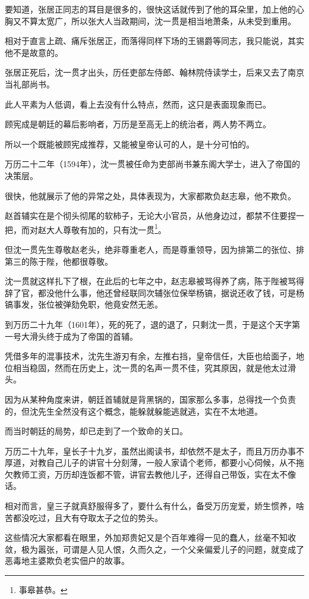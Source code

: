 \begin{multicols}{\theparacolNo}
		要知道，张居正同志的耳目是很多的，很快这话就传到了他的耳朵里，加上他的心胸又不算太宽广，所以张大人当政期间，沈一贯是相当地萧条，从未受到重用。

		相对于直言上疏、痛斥张居正，而落得同样下场的王锡爵等同志，我只能说，其实他不是故意的。

		张居正死后，沈一贯才出头，历任吏部左侍郎、翰林院侍读学士，后来又去了南京当礼部尚书。

		此人平素为人低调，看上去没有什么特点，然而，这只是表面现象而已。

		顾宪成是朝廷的幕后影响者，万历是至高无上的统治者，两人势不两立。

		所以一个既能被顾宪成推荐，又能被皇帝认可的人，是十分可怕的。

		万历二十二年（1594年），沈一贯被任命为吏部尚书兼东阁大学士，进入了帝国的决策层。

		很快，他就展示了他的异常之处，具体表现为，大家都欺负赵志皋，他不欺负。

		赵首辅实在是个彻头彻尾的软柿子，无论大小官员，从他身边过，都禁不住要捏一把，而对赵大人尊敬有加的，只有沈一贯\footnote{事皋甚恭。}。

		但沈一贯先生尊敬赵老头，绝非尊重老人，而是尊重领导，因为排第二的张位、排第三的陈于陛，他都很尊敬。

		沈一贯就这样扎下了根，在此后的七年之中，赵志皋被骂得养了病，陈于陛被骂得辞了官，都没他什么事，他还曾经联同次辅张位保举杨镐，据说还收了钱，可是杨镐事发，张位被弹劾免职，他竟安然无恙。

		到万历二十九年（1601年），死的死了，退的退了，只剩沈一贯，于是这个天字第一号大滑头终于成为了帝国的首辅。

		凭借多年的混事技术，沈先生游刃有余，左推右挡，皇帝信任，大臣也给面子，地位相当稳固，然而在历史上，沈一贯的名声一贯不佳，究其原因，就是他太过滑头。

		因为从某种角度来讲，朝廷首辅就是背黑锅的，国家那么多事，总得找一个负责的，但沈先生全然没有这个概念，能躲就躲能逃就逃，实在不太地道。

		而当时朝廷的局势，却已走到了一个致命的关口。

		万历二十九年，皇长子十九岁，虽然出阁读书，却依然不是太子，而且万历办事不厚道，对教自己儿子的讲官十分刻薄，一般人家请个老师，都要小心伺候，从不拖欠教师工资，万历却连饭都不管，讲官去教他儿子，还得自己带饭，实在太不像话。

		相对而言，皇三子就真舒服得多了，要什么有什么，备受万历宠爱，娇生惯养，啥苦都没吃过，且大有夺取太子之位的势头。

		这些情况大家都看在眼里，外加郑贵妃又是个百年难得一见的蠢人，丝毫不知收敛，极为嚣张，可谓是人见人恨，久而久之，一个父亲偏爱儿子的问题，就变成了恶毒地主婆欺负老实佃户的故事。


\end{multicols}
